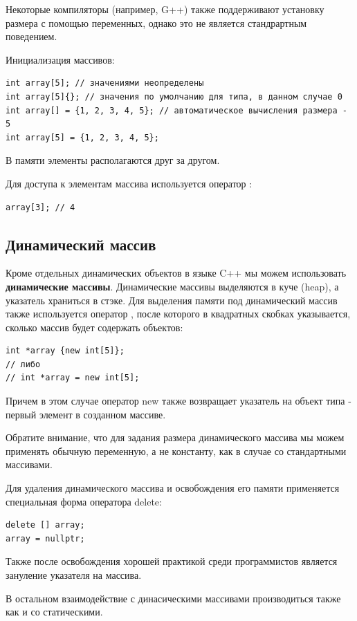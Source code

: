 Некоторые компиляторы (например, G++) также поддерживают установку размера с помощью переменных, однако это не является стандрартным поведением.

Инициализация массивов:
\begin{verbatim}
int array[5]; // значениями неопределены
int array[5]{}; // значения по умолчанию для типа, в данном случае 0
int array[] = {1, 2, 3, 4, 5}; // автоматическое вычисления размера - 5
int array[5] = {1, 2, 3, 4, 5};
\end{verbatim}

В памяти элементы располагаются друг за другом.

Для доступа к элементам массива используется оператор \mverb{[]}:
\begin{verbatim}
array[3]; // 4
\end{verbatim}

\subsection{Динамический массив}

Кроме отдельных динамических объектов в языке C++ мы можем использовать \textbf{динамические массивы}. Динамические массивы выделяются в куче (heap), а указатель храниться в стэке. Для выделения памяти под динамический массив также используется оператор , после которого в квадратных скобках указывается, сколько массив будет содержать объектов:

\begin{verbatim}
int *array {new int[5]};
// либо
// int *array = new int[5];
\end{verbatim}

Причем в этом случае оператор new также возвращает указатель на объект типа  - первый элемент в созданном массиве.

Обратите внимание, что для задания размера динамического массива мы можем применять обычную переменную, а не константу, как в случае со стандартными массивами.

Для удаления динамического массива и освобождения его памяти применяется специальная форма оператора delete:
\begin{verbatim}
delete [] array;
array = nullptr;
\end{verbatim}

Также после освобождения хорошей практикой среди программистов является зануление указателя на массива.

В остальном взаимодействие с динасическими массивами производиться также как и со статическими.

